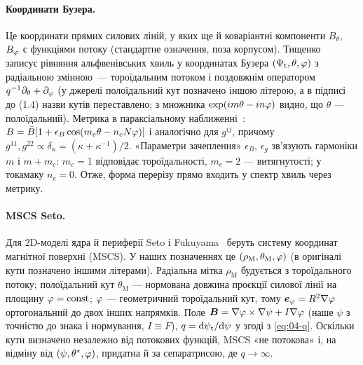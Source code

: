 \paragraph{Координати Бузера.} Це координати прямих силових ліній, у яких ще й коваріантні компоненти $B_\theta$, $B_\varphi$ є функціями потоку (стандартне означення, поза корпусом). Тищенко~\cite[с.~25]{Tyshchenko2021} записує рівняння альфвенівських хвиль у координатах Бузера $(\Psi_{\mathrm{t}},\theta,\varphi)$ з радіальною змінною~--- тороїдальним потоком і поздовжнім оператором $q^{-1}\partial_\theta+\partial_\varphi$ (у джерелі полоїдальний кут позначено іншою літерою, а в підписі до (1.4) назви кутів переставлено; з множника $\exp(im\theta-in\varphi)$ видно, що $\theta$ --- полоїдальний). Метрика в параксіальному наближенні~\cite[с.~26]{Tyshchenko2021}: $B=\bar B[1+\epsilon_B\cos(m_c\theta-n_cN\varphi)]$ і аналогічно для $g^{ij}$, причому $g^{11},g^{22}\propto\delta_\kappa=(\kappa+\kappa^{-1})/2$. «Параметри зачеплення» $\epsilon_B$, $\epsilon_g$ зв'язують гармоніки $m$ і $m+m_c$: $m_c=1$ відповідає тороїдальності, $m_c=2$ --- витягнутості; у токамаку $n_c=0$. Отже, форма перерізу прямо входить у спектр хвиль через метрику.

\paragraph{MSCS Seto.} Для 2D-моделі ядра й периферії Seto і Fukuyama~\cite[с.~2]{Seto2014} беруть систему координат магнітної поверхні (MSCS). У наших позначеннях це $(\rho_{\mathrm{M}},\theta_{\mathrm{M}},\varphi)$ (в оригіналі кути позначено іншими літерами). Радіальна мітка $\rho_{\mathrm{M}}$ будується з тороїдального потоку; полоїдальний кут $\theta_{\mathrm{M}}$ --- нормована довжина проєкції силової лінії на площину $\varphi=\text{const}$; $\varphi$ --- геометричний тороїдальний кут, тому $\bm{e}_\varphi=R^2\nabla\varphi$ ортогональний до двох інших напрямків. Поле $\bm{B}=\nabla\varphi\times\nabla\psi+I\nabla\varphi$ (наше $\psi$ з точністю до знака і нормування, $I\equiv F$), $q=\mathrm{d}\psi_{\mathrm{t}}/\mathrm{d}\psi$ у згоді з \eqref{eq:04-q}. Оскільки кути визначено незалежно від потокових функцій, MSCS «не потокова» і, на відміну від $(\psi,\theta^{*},\varphi)$, придатна й за сепаратрисою, де $q\to\infty$.

